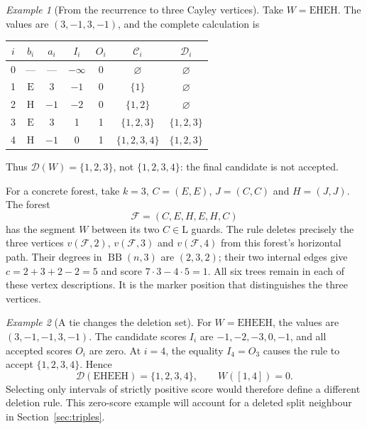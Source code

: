 \documentclass[11pt,a4paper]{article}
\theoremstyle{definition}
\theoremstyle{remark}
\newtheorem{example}{Example}[section]
\newcommand{\BB}{\operatorname{BB}}
\newcommand{\E}{\mathrm E}
\newcommand{\HH}{\mathrm H}
\newcommand{\LL}{\mathrm L}
\begin{document}
\begin{example}[From the recurrence to three Cayley vertices]\label{ex:basic-deletion}
Take $W=\E\HH\E\HH$. The values are $(3,-1,3,-1)$, and the complete calculation is
\begin{center}
\begin{tabular}{ccccccc}
\toprule
$i$&$b_i$&$a_i$&$I_i$&$O_i$&$\mathcal C_i$&$\mathcal D_i$\\
\midrule
0&---&---&$-\infty$&0&$\varnothing$&$\varnothing$\\
1&$\E$&3&$-1$&0&$\{1\}$&$\varnothing$\\
2&$\HH$&$-1$&$-2$&0&$\{1,2\}$&$\varnothing$\\
3&$\E$&3&1&1&$\{1,2,3\}$&$\{1,2,3\}$\\
4&$\HH$&$-1$&0&1&$\{1,2,3,4\}$&$\{1,2,3\}$\\
\bottomrule
\end{tabular}
\end{center}
Thus $\mathcal D(W)=\{1,2,3\}$, not $\{1,2,3,4\}$: the final candidate is not accepted.

For a concrete forest, take $k=3$, $C=(E,E)$, $J=(C,C)$ and $H=(J,J)$. The forest
\[
\mathcal F=(C,E,H,E,H,C)
\]
has the segment $W$ between its two $C\in\LL$ guards. The rule deletes precisely the three vertices $v(\mathcal F,2)$, $v(\mathcal F,3)$ and $v(\mathcal F,4)$ from this forest's horizontal path. Their degrees in $\BB(n,3)$ are $(2,3,2)$; their two internal edges give $c=2+3+2-2=5$ and score $7\cdot3-4\cdot5=1$. All six trees remain in each of these vertex descriptions. It is the marker position that distinguishes the three vertices.
\end{example}

\begin{example}[A tie changes the deletion set]\label{ex:zero-score}
For $W=\E\HH\E\E\HH$, the values are $(3,-1,-1,3,-1)$. The candidate scores $I_i$ are $-1,-2,-3,0,-1$, and all accepted scores $O_i$ are zero. At $i=4$, the equality $I_4=O_3$ causes the rule to accept $\{1,2,3,4\}$. Hence
\[
\mathcal D(\E\HH\E\E\HH)=\{1,2,3,4\},
\qquad W([1,4])=0.
\]
Selecting only intervals of strictly positive score would therefore define a different deletion rule. This zero-score example will account for a deleted split neighbour in Section~\ref{sec:triples}.
\end{example}
\end{document}
